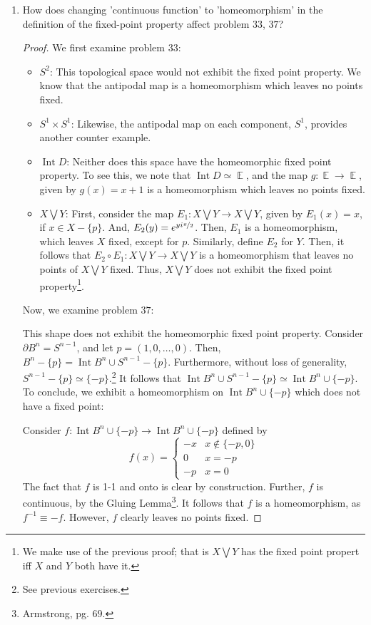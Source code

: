 \documentclass{book}
\DeclareMathOperator*{\Int}{\text{Int}}
\DeclareMathOperator*{\E}{\mathbb{E}}
\begin{document}
\begin{enumerate}[(1)]
    \item How does changing 'continuous function' to 'homeomorphism' in the definition of the fixed-point property affect problem $33$, $37$?
        \begin{proof} We first examine problem $33$: 
            \begin{itemize}
                \item[] $S^2$: This topological space would not exhibit the fixed point property. We know that the antipodal map is a homeomorphism which leaves no points fixed. 
                \item[] $S^1 \times S^1$: Likewise, the antipodal map on each component, $S^1$, provides another counter example.
                \item[] $\Int{D}$: Neither does this space have the homeomorphic fixed point property. To see this, we note that $\Int{D} \simeq \E$, and the map $g: \E \rightarrow \E$, given by $g(x) = x+1$ is a homeomorphism which leaves no points fixed.
                \item[] $X \bigvee Y$: First, consider the map $E_1: X \bigvee Y \rightarrow X \bigvee Y$, given by $E_1(x) = x$, if $x \in X -\{p\}$. And, $E_2(y) = e^{yi\nicefrac{\pi}{2}}$. Then, $E_1$ is a homeomorphism, which leaves $X$ fixed, except for $p$. Similarly, define $E_2$ for $Y$. Then, it follows that $E_2 \circ E_1:X \bigvee Y \rightarrow X \bigvee Y$ is a homeomorphism that leaves no points of $X \bigvee Y$ fixed. Thus, $X \bigvee Y$ does not exhibit the fixed point property\footnote{We make use of the previous proof; that is $X \bigvee Y$ has the fixed point propert iff $X$ and $Y$ both have it.}. 
            \end{itemize}
            \par Now, we examine problem $37$:
            \par This shape does not exhibit the homeomorphic fixed point property. Consider $\partial B^n = S^{n-1}$, and let $p = (1,0,\dots,0)$. Then, $B^n - \{p\} = \Int{B^n} \cup S^{n-1} - \{p\}$. Furthermore, without loss of generality, $S^{n-1} -\{p\} \simeq \{-p\}$.\footnote{See previous exercises.} It follows that $\Int{B^n} \cup S^{n-1} - \{p\} \simeq \Int{B^n} \cup \{-p\}$. To conclude, we exhibit a homeomorphism on $\Int{B^n} \cup \{-p\}$  which does not have a fixed point: 
            \par Consider $f: \Int{B^n} \cup \{-p\} \rightarrow \Int{B^n} \cup \{-p\}$ defined by 
            \[ f(x) = 
            \begin{cases}
                -x & x \notin \{-p, 0\} \\
                0 & x = -p \\
                -p & x = 0 
            \end{cases}\]
            The fact that $f$ is 1-1 and onto is clear by construction. Further, $f$ is continuous, by the Gluing Lemma\footnote{Armstrong, pg. $69$.}. It follows that $f$ is a homeomorphism, as $f^{-1} \equiv -f$. However, $f$ clearly leaves no points fixed. 
        \end{proof}

\end{enumerate}
\end{document}

